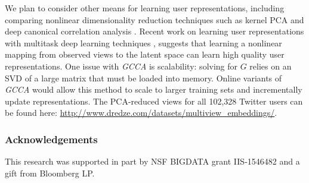\documentclass{article}
\newcommand{\gcca}{\emph{GCCA}} %
\begin{document}
We plan to consider other means for learning user representations, including comparing nonlinear dimensionality reduction techniques such as kernel PCA \cite{scholkopf1997} and deep canonical correlation analysis \cite{andrew2013,wang2015deep}.
Recent work on learning user representations with multitask deep learning techniques \cite{li2015}, suggests that learning a nonlinear mapping from observed views to the latent space can learn high quality user representations.
One issue with \gcca{} is scalability: solving for $G$ relies on an SVD of a large matrix that must be loaded into memory.  Online variants of \gcca{} would allow this method to scale to larger training sets and incrementally update representations.  The PCA-reduced views for all 102,328 Twitter users can be found here: \url{http://www.dredze.com/datasets/multiview_embeddings/}.

\subsubsection*{Acknowledgements}
\noindent This research was supported in part by NSF BIGDATA grant IIS-1546482 and a gift
from Bloomberg LP. 
\end{document}
